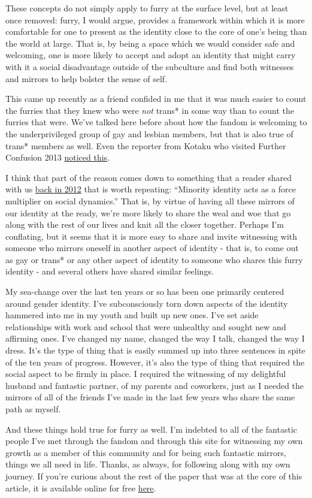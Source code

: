 These concepts do not simply apply to furry at the surface level, but at
least once removed: furry, I would argue, provides a framework within
which it is more comfortable for one to present as the identity close to
the core of one's being than the world at large. That is, by being a
space which we would consider safe and welcoming, one is more likely to
accept and adopt an identity that might carry with it a social
disadvantage outside of the subculture and find both witnesses and
mirrors to help bolster the sense of self.

This came up recently as a friend confided in me that it was much easier
to count the furries that they knew who were \emph{not} trans* in some
way than to count the furries that were. We've talked here before about
how the fandom is welcoming to the underprivileged group of gay and
lesbian members, but that is also true of trans* members as well. Even
the reporter from Kotaku who visited Further Confusion 2013
\href{http://kotaku.com/5978236/my-weekend-at-a-furry-convention}{noticed
this}.

I think that part of the reason comes down to something that a reader
shared with us
\href{http://adjectivespecies.com/2012/01/11/the-dramagogues-episode-1-strife/}{back
in 2012} that is worth repeating: ``Minority identity acts as a force
multiplier on social dynamics.'' That is, by virtue of having all these
mirrors of our identity at the ready, we're more likely to share the
weal and woe that go along with the rest of our lives and knit all the
closer together. Perhaps I'm conflating, but it seems that it is more
easy to share and invite witnessing with someone who mirrors oneself in
another aspect of identity - that is, to come out as gay or trans* or
any other aspect of identity to someone who shares this furry identity -
and several others have shared similar feelings.

My sea-change over the last ten years or so has been one primarily
centered around gender identity. I've subconsciously torn down aspects
of the identity hammered into me in my youth and built up new ones. I've
set aside relationships with work and school that were unhealthy and
sought new and affirming ones. I've changed my name, changed the way I
talk, changed the way I dress. It's the type of thing that is easily
summed up into three sentences in spite of the ten years of progress.
However, it's also the type of thing that required the social aspect to
be firmly in place. I required the witnessing of my delightful husband
and fantastic partner, of my parents and coworkers, just as I needed the
mirrors of all of the friends I've made in the last few years who share
the same path as myself.

And these things hold true for furry as well. I'm indebted to all of the
fantastic people I've met through the fandom and through this site for
witnessing my own growth as a member of this community and for being
such fantastic mirrors, things we all need in life. Thanks, as always,
for following along with my own journey. If you're curious about the
rest of the paper that was at the core of this article, it is available
online for free \href{http://web.uvic.ca/~ahdevor/Witnessing.pdf}{here}.
